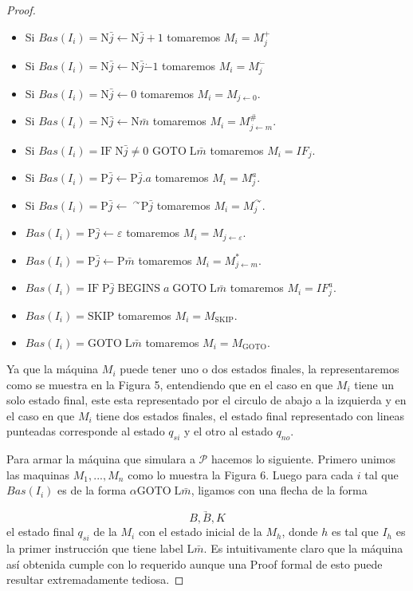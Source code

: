 \begin{lemma}
\begin{proof}
		\begin{itemize}
			\item Si $Bas(I_{i})=\mathrm{N}\bar{j}\leftarrow \mathrm{N}\bar{j}+1$ tomaremos $M_{i}=M_{j}^{+}$
	    \item Si $Bas(I_{i})=\mathrm{N}\bar{j}\leftarrow \mathrm{N}\bar{j}\dot{-} 1 $ tomaremos $M_{i}=M_{j}^{\dot{-}}$
	    \item Si $Bas(I_{i})=\mathrm{N}\bar{j}\leftarrow 0$ tomaremos $ M_{i}=M_{j\leftarrow 0}$.
	    \item Si $Bas(I_{i})=\mathrm{N}\bar{j}\leftarrow \mathrm{N}\bar{m}$ tomaremos $M_{i}=M_{j\leftarrow m}^{\#}$.
	    \item Si $Bas(I_{i})=\mathrm{IF}\;\mathrm{N}\bar{j}\not=0$ $\mathrm{GOTO} \;\mathrm{L}\bar{m}$ tomaremos $M_{i}=IF_{j}.$
	    \item Si $Bas(I_{i})=\mathrm{P}\bar{j}\leftarrow \mathrm{P}\bar{j}.a$ tomaremos $M_{i}=M_{j}^{a}$.
	    \item Si $Bas(I_{i})=\mathrm{P}\bar{j}\leftarrow \ ^{\curvearrowright } \mathrm{P}\bar{j}$ tomaremos $M_{i}=M_{j}^{\curvearrowright }$.
	    \item $Bas(I_{i})=\mathrm{P}\bar{j}\leftarrow \varepsilon $ tomaremos $ M_{i}=M_{j\leftarrow \varepsilon }$.
	    \item $Bas(I_{i})=\mathrm{P}\bar{j}\leftarrow \mathrm{P}\bar{m}$ tomaremos $M_{i}=M_{j\leftarrow m}^{\ast }$.
	    \item $Bas(I_{i})=\mathrm{IF}\;\mathrm{P}\bar{j}\;\mathrm{BEGINS}\;a\; \mathrm{GOTO}\;\mathrm{L}\bar{m}$ tomaremos $M_{i}=IF_{j}^{a}$.
	    \item $Bas(I_{i})=\mathrm{SKIP}$ tomaremos $M_{i}=M_{\mathrm{SKIP}}$.
	    \item $Bas(I_{i})=\mathrm{GOTO}\;\mathrm{L}\bar{m}$ tomaremos $ M_{i}=M_{\mathrm{GOTO}}$.
		\end{itemize}

    Ya que la máquina $M_{i}$ puede tener uno o dos estados finales, la representaremos como se muestra en la Figura 5,
    entendiendo que en el caso en que $M_{i}$ tiene un solo estado final, este esta representado por el circulo de
    abajo a la izquierda y en el caso en que $M_{i}$ tiene dos estados finales, el estado final representado con lineas
     punteadas corresponde al estado $q_{si}$ y el otro al estado $q_{no}$.

    Para armar la máquina que simulara a $\mathcal{P}$ hacemos lo siguiente. Primero unimos las maquinas
    $M_{1},...,M_{n}$ como lo muestra la Figura 6. Luego para cada $i$ tal que $Bas(I_{i})$ es de la forma
    $\alpha \mathrm{GOTO} \;\mathrm{L}\bar{m}$, ligamos con una flecha de la forma

		\[
    \displaystyle \underrightarrow{\;\;\;\;\;\;B,B,K\;\;\;\;\;\;}
		\]
    el estado final $q_{si}$ de la $M_{i}$ con el estado inicial de la $M_{h}$, donde $h$ es tal que $I_{h}$ es la
    primer instrucción que tiene label $ \mathrm{L}\bar{m}$.
    Es intuitivamente claro que la máquina así obtenida cumple con lo requerido aunque una Proof formal de esto puede
    resultar extremadamente tediosa.
	\end{proof}
	\end{lemma}

